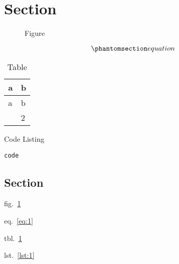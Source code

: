 \section{Section}\label{section}

\begin{figure}
\centering
{}
\caption{Figure}\label{fig:1}
\end{figure}

\begin{equation}\phantomsection\label{eq:1}{equation}\end{equation}

\begin{longtable}[]{@{}ll@{}}
\caption{\label{tbl:1}Table}\tabularnewline
\toprule\noalign{}
a & b \\
\midrule\noalign{}
\endfirsthead
\toprule\noalign{}
a & b \\
\midrule\noalign{}
\endhead
\bottomrule\noalign{}
\endlastfoot
1 & 2 \\
\end{longtable}

\begin{codelisting}

\caption{Code Listing}\label{lst:1}

\begin{verbatim}
code
\end{verbatim}

\end{codelisting}

\subsection{Section}\label{section-1}

fig.~\ref{fig:1}

eq.~\ref{eq:1}

tbl.~\ref{tbl:1}

lst.~\ref{lst:1}
